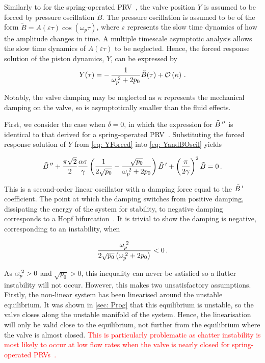 Similarly to for the spring-operated PRV~\cite{Hos2015ModelPipe}, the valve position $Y$ is assumed to be forced by pressure oscillation $\tilde{B}$. The pressure oscillation is assumed to be of the form $\tilde{B} = A(\varepsilon \tau) \cos\left( \omega_p \tau \right)$, where $\varepsilon$ represents the slow time dynamics of how the amplitude changes in time. A multiple timescale asymptotic analysis allows the slow time dynamics of $A(\varepsilon \tau)$ to be neglected. Hence, the forced response solution of the piston dynamics, $Y$, can be expressed by
~
\begin{equation} \label{eq: YForced}
    Y(\tau) = - \, \frac{1}{\omega_p^{\;2} + 2 p_0} \tilde{B}(\tau) + \mathcal{O}\left( \kappa \right) \, .
\end{equation}

Notably, the valve damping may be neglected as $\kappa$ represents the mechanical damping on the valve, so is asymptotically smaller than the fluid effects.

First, we consider the case when $\delta = 0$, in which the expression for $\tilde{B}\,{''}$ is identical to that derived for a spring-operated PRV~\cite{Hos2015DynamicModelling}. Substituting the forced response solution of $Y$ from \cref{eq: YForced} into \cref{eq: YandBOscil} yields

\begin{equation*}
    \tilde{B}\,{''} + \frac{\pi \sqrt{2}}{2} \frac{\alpha \sigma}{\gamma} \left( \frac{1}{2 \sqrt{p_0}} - \frac{\sqrt{p_0}}{\omega_p^{\;2}+2 p_0} \right) \tilde{B}\,{'} + \left( \frac{\pi}{2 \gamma} \right)^2 \tilde{B} = 0 \, .
\end{equation*}

This is a second-order linear oscillator with a damping force equal to the $\tilde{B}\,{'}$ coefficient. The point at which the damping switches from positive damping, dissipating the energy of the system for stability, to negative damping corresponds to a Hopf bifurcation~\cite{Kuznetsov2004ElementsTheory}. It is trivial to show the damping is negative, corresponding to an instability, when

\begin{equation*}
    \frac{\omega_p^{\;2}}{2 \sqrt{p_0} \left( \omega_p^{\;2} + 2 p_0 \right)} < 0 \, .
\end{equation*}

As $\omega_p^{\;2} > 0$ and $\sqrt{p_0} > 0$, this inequality can never be satisfied so a flutter instability will not occur. However, this makes two unsatisfactory assumptions. Firstly, the non-linear system has been linearised around the unstable equilibrium. It was shown in \cref{sec: Prog} that this equilibrium is unstable, so the valve closes along the unstable manifold of the system. Hence, the linearisation will only be valid close to the equilibrium, not further from the equilibrium where the valve is almost closed. \textcolor{Red}{This is particularly problematic as chatter instability is most likely to occur at low flow rates when the valve is nearly closed for spring-operated PRVs~\cite{Hos2016DynamicService}.}

